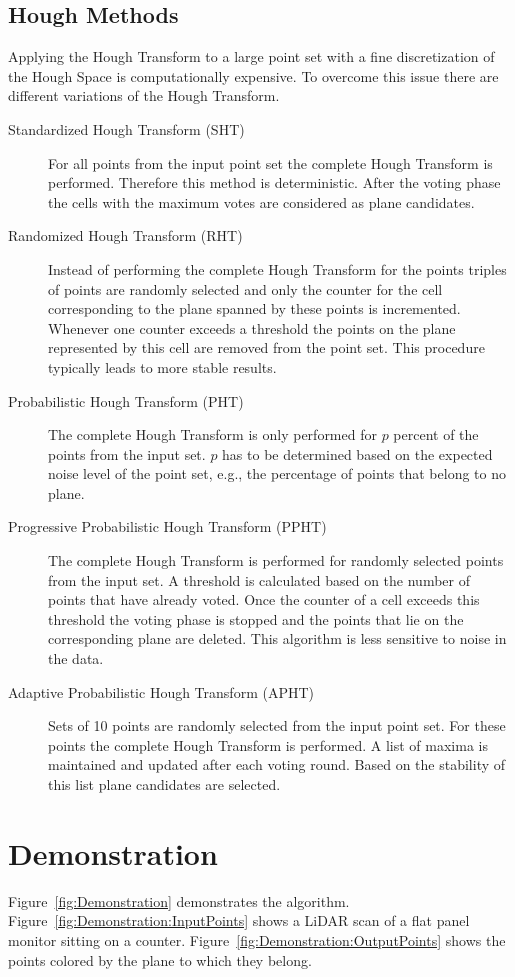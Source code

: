 \documentclass{InsightArticle}
\begin{document}
\subsection{Hough Methods}
Applying the Hough Transform to a large point set with a fine discretization of
the Hough Space is computationally expensive. To overcome this issue there are
different variations of the Hough Transform.
\begin{description}
\item[Standardized Hough Transform (SHT)] For all points from the input point
set the complete Hough Transform is performed. Therefore this method is
deterministic. After the voting phase the cells with the maximum votes are
considered as plane candidates.
\item[Randomized Hough Transform (RHT)] Instead of performing the complete Hough
Transform for the points triples of points are randomly selected and
only the counter for the cell corresponding to the plane spanned by these points
is incremented. Whenever one counter exceeds a threshold the points
on the plane represented by this cell are removed from the point set. This
procedure typically leads to more stable results.
\item[Probabilistic Hough Transform (PHT)] The complete Hough Transform is only
performed for $p$ percent of the points from the input set. $p$ has to be
determined based on the expected noise level of the point set, e.g., the
percentage 
of points that
belong to no plane.
\item[Progressive Probabilistic Hough Transform (PPHT)] The complete Hough
Transform is performed for randomly selected points from the input set. A
threshold is calculated based on the number of points that have already voted.
Once the counter of a cell exceeds this threshold the voting phase is stopped and
the points that lie on the corresponding plane are deleted. This algorithm is less sensitive to noise in the data.
\item[Adaptive Probabilistic Hough Transform (APHT)] Sets of 10 points are
randomly selected from the input point set. For these points the complete Hough
Transform is performed. A list of maxima is maintained and updated after each
voting round. Based on the stability of this list plane candidates are
selected.
\end{description}
\section{Demonstration}
Figure~\ref{fig:Demonstration} demonstrates the algorithm.
Figure~\ref{fig:Demonstration:InputPoints} shows a LiDAR scan of a flat panel
monitor sitting on a counter. Figure~\ref{fig:Demonstration:OutputPoints} shows the points colored by the plane to which they belong.
\end{document}
